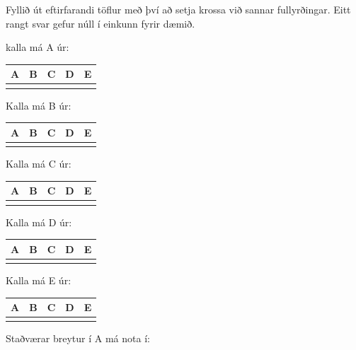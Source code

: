 \documentclass{article}
\newcommand{\bo}[1]{\textbf{#1}}
\begin{document}
Fyllið út eftirfarandi töflur með því að setja krossa við sannar fullyrðingar.
Eitt rangt svar gefur núll í einkunn fyrir dæmið.

kalla má A úr:


\begin{tabularx}{\textwidth}{|X|X|X|X|X|}
    \hline
    \bo{A} & \bo{B} & \bo{C} & \bo{D} & \bo{E}\\ \hline
    & & & & \\ \hline
\end{tabularx}

\newpage
Kalla má B úr:


\begin{tabularx}{\textwidth}{|X|X|X|X|X|}
    \hline
    \bo{A} & \bo{B} & \bo{C} & \bo{D} & \bo{E}\\ \hline
    & & & & \\ \hline
\end{tabularx}


\vspace{1cm}

Kalla má C úr:


\begin{tabularx}{\textwidth}{|X|X|X|X|X|}
    \hline
    \bo{A} & \bo{B} & \bo{C} & \bo{D} & \bo{E}\\ \hline
    & & & & \\ \hline
\end{tabularx}

\vspace{1cm}

Kalla má D úr: 


\begin{tabularx}{\textwidth}{|X|X|X|X|X|}
    \hline
    \bo{A} & \bo{B} & \bo{C} & \bo{D} & \bo{E}\\ \hline
    & & & & \\ \hline
\end{tabularx}


\vspace{1cm}

Kalla má E úr:


\begin{tabularx}{\textwidth}{|X|X|X|X|X|}
    \hline
    \bo{A} & \bo{B} & \bo{C} & \bo{D} & \bo{E}\\ \hline
    & & & & \\ \hline
\end{tabularx}

\vspace{1cm}

Staðværar breytur í A má nota í:
\end{document}

